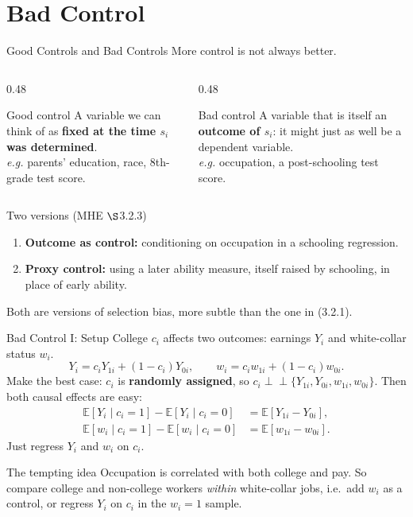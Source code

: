 \documentclass[aspectratio=169,11pt]{beamer}
\newcommand{\E}{\mathbb{E}}
\newcommand{\indep}{\perp\!\!\!\perp}
\begin{document}
\section{Bad Control}
\begin{frame}{Good Controls and Bad Controls}
\small
More control is not always better.
\medskip
\begin{columns}[T]
\begin{column}{0.48\textwidth}
\begin{block}{Good control}
A variable we can think of as \textbf{fixed at the time $s_i$ was determined}.\\[0.3em]
\textit{e.g.} parents' education, race, 8th-grade test score.
\end{block}
\end{column}
\begin{column}{0.48\textwidth}
\begin{block}{Bad control}
A variable that is itself an \textbf{outcome of $s_i$}: it might just as well be a dependent variable.\\[0.3em]
\textit{e.g.} occupation, a post-schooling test score.
\end{block}
\end{column}
\end{columns}
\medskip
\begin{block}{Two versions (MHE \ensuremath{\S}3.2.3)}
\begin{enumerate}
\item \textbf{Outcome as control:} conditioning on occupation in a schooling regression.
\item \textbf{Proxy control:} using a later ability measure, itself raised by schooling, in place of early ability.
\end{enumerate}
\end{block}
\medskip
Both are versions of \alert{selection bias}, more subtle than the one in (3.2.1).
\end{frame}

\begin{frame}{Bad Control I: Setup}
\small
College $c_i$ affects two outcomes: earnings $Y_i$ and white-collar status $w_i$.
\[
Y_i=c_iY_{1i}+(1-c_i)Y_{0i},\qquad
w_i=c_iw_{1i}+(1-c_i)w_{0i}.
\]
Make the best case: $c_i$ is \textbf{randomly assigned}, so $c_i\indep\{Y_{1i},Y_{0i},w_{1i},w_{0i}\}$. Then both causal effects are easy:
\[
\begin{aligned}
\E[Y_i\mid c_i=1]-\E[Y_i\mid c_i=0]&=\E[Y_{1i}-Y_{0i}],\\
\E[w_i\mid c_i=1]-\E[w_i\mid c_i=0]&=\E[w_{1i}-w_{0i}].
\end{aligned}
\]
Just regress $Y_i$ and $w_i$ on $c_i$.
\medskip
\begin{block}{The tempting idea}
Occupation is correlated with both college and pay. So compare college and non-college workers
\emph{within} white-collar jobs, i.e.\ add $w_i$ as a control, or regress $Y_i$ on $c_i$ in the $w_i=1$ sample.
\end{block}
\end{frame}
\end{document}
